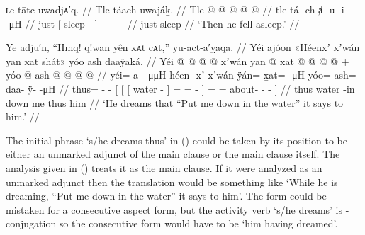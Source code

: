 \ex\label{ex:90-26-fell-asleep}%
%
\begingl
	\glpreamble	ʟe tātc uwadjᴀ′q. //
	\glpreamble	Tle táach uwajáḵ. //
	\gla	Tle {}  @ {} {}
		 @ {} @ {} @ {} @ {} //
	\glb	tle {} tá -ch {}
		ⱥ- u- i-  -μH //
	\glc	just {}[ sleep - {}]
		- - -  - //
	\gld	just {} sleep {} {}
		 {} {} {} {} //
	\glft	‘Then he fell asleep.’
		//
\endgl
\xe

\ex\label{ex:90-27-put-me-in-water}%
%
\begingl
	\glpreamble	Ye adjū′n, “Hīnq! q!wan yên xᴀt cᴀt,” yu-act-ā′ỵaqa. //
	\glpreamble	Yéi ajóon «\!Héenxʼ xʼwán yan x̱at shát\!» yóo ash daaÿaḵá. //
	\gla	Yéi @  @ {} @ {}
		{} {} {}  @ {} {} 
					xʼwán
					yan @ x̱at @  @ {} @ {} @ {} {} +
			yóo @ ash @  @ {} @ {} @ {} {} //
	\glb	yéi= a-  -μμH
		{} {} {} héen -xʼ {}
					xʼwán
					ÿán= x̱at= {} {}  -μH {}
			yóo= ash= daa- ÿ-  -μH {} //
	\glc	thus= -  -
		{}[\pr{CP} {}[ {}[ water - {}]
					= = \· \·  - {}]
			= = about- -  - {}] //
	\gld	thus  {} {}
		{} {} {} water -in {}
					down me  {} {} {} {} 
			thus him  {} {} {} {} //
	\glft	‘He dreams that “Put me down in the water” it says to him.’
		//
\endgl
\xe

The initial phrase  ‘s/he dreams thus’ in (\lastx) could be taken by its position to be either an unmarked adjunct of the main clause or the main clause itself.
The analysis given in (\lastx) treats it as the main clause.
If it were analyzed as an unmarked adjunct then the translation would be something like ‘While he is dreaming, “Put me down in the water” it says to him’.
The form  could be mistaken for a consecutive aspect form, but the activity verb  ‘s/he dreams’ is -conjugation so the consecutive form would have to be  ‘him having dreamed’.

